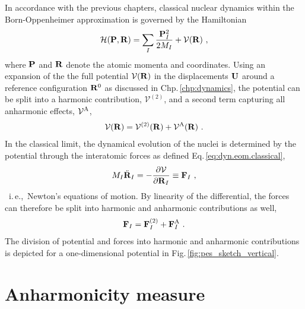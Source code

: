 In accordance with the previous chapters, classical nuclear dynamics within the Born-Oppenheimer approximation is governed by the Hamiltonian
\begin{align}
	\mathcal H ( {\bf P}, {\bf R}) 
		= \sum_I \frac{\b P_I^2}{2 M_I} + \mathcal V (\b R)~,
	\label{eq:anh.H}
\end{align}
where $\bf P$ and $\bf R$ denote the atomic momenta and coordinates. Using an expansion of the the full potential $\mathcal V ({\bf R})$ in the displacements $\bf U$ around a reference configuration ${\bf R}^0$ as discussed in Chp.\,\ref{chp:dynamics}, the potential can be split into a harmonic contribution, $\mathcal V^{(2)}$, and a second term capturing all anharmonic effects, $\mathcal V^{\rm A}$,
\begin{align}
	\mathcal V ({\bf R})
		= \mathcal V^{(2)} ({\bf R}) + \mathcal V^{\rm A} ({\bf R})~.
	\label{eq:anh.V}
\end{align}
In the classical limit, the dynamical evolution of the nuclei is determined by the potential through the interatomic forces as defined Eq.\,\eqref{eq:dyn.eom.classical},
\begin{align}
	M_I \ddot{\bf R}_I
		= -\frac{\partial \mathcal V}{\partial {\bf R}_I}
		\equiv {\bf F}_I~,
\end{align}
~i.\,e.,~Newton's equations of motion. By linearity of the differential, the forces can therefore be split into harmonic and anharmonic contributions as well,
\begin{align}
	{\bf F}_I
		= {\bf F}_I^{(2)} + {\bf F}_I^{\rm A}~.
	\label{eq:anh.F}
\end{align}
The division of potential and forces into harmonic and anharmonic contributions is depicted for a one-dimensional potential in Fig.\,\ref{fig:pes_sketch_vertical}.



\section{Anharmonicity measure}
\label{sec:anharmonicity_measure}

